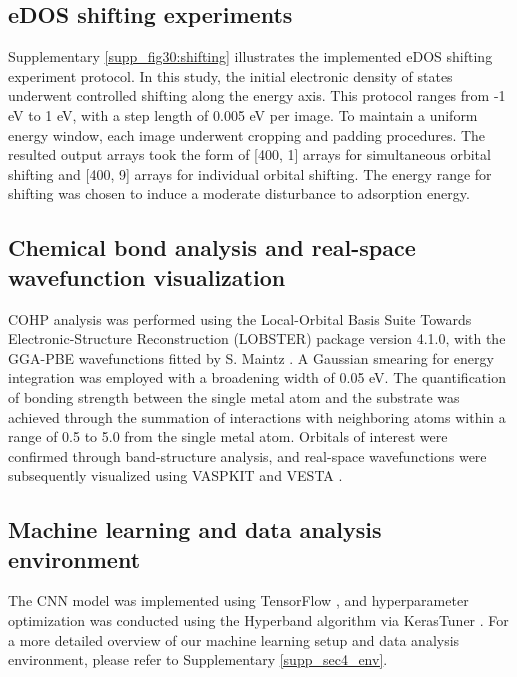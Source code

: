 \documentclass[a4paper, 12pt, titlepage]{article}
\begin{document}
    \subsection{eDOS shifting experiments}
    Supplementary \cref{supp_fig30:shifting} illustrates the implemented eDOS shifting experiment protocol.
    In this study, the initial electronic density of states underwent controlled shifting along the energy axis.
    This protocol ranges from -1 eV to 1 eV, with a step length of 0.005 eV per image.
    To maintain a uniform energy window, each image underwent cropping and padding procedures.
    The resulted output arrays took the form of [400, 1] arrays for simultaneous orbital shifting and [400, 9] arrays for individual orbital shifting.
    The energy range for shifting was chosen to induce a moderate disturbance to adsorption energy.


    \subsection{Chemical bond analysis and real-space wavefunction visualization}
    COHP analysis was performed using the Local-Orbital Basis Suite Towards Electronic-Structure Reconstruction (LOBSTER) package  \cite{deringer2011crystal, koga1999analytical, nelson2020lobster, maintz2013analytic, dronskowski1993crystal} version 4.1.0, with the GGA-PBE wavefunctions fitted by S. Maintz \cite{koga1999analytical, maintz2016lobster}.
    A Gaussian smearing for energy integration was employed with a broadening width of 0.05 eV.
    The quantification of bonding strength between the single metal atom and the substrate was achieved through the summation of interactions with neighboring atoms within a range of 0.5 \text{\AA} to 5.0 \text{\AA} from the single metal atom.
    Orbitals of interest were confirmed through band-structure analysis, and real-space wavefunctions were subsequently visualized using VASPKIT \cite{wang2021vaspkit} and VESTA \cite{momma2008vesta}.

    \subsection{Machine learning and data analysis environment}
    The CNN model was implemented using TensorFlow \cite{abadi2016tensorflow}, and hyperparameter optimization was conducted using the Hyperband \cite{li2018hyperband} algorithm via KerasTuner \cite{omalley2019kerastuner}.
    For a more detailed overview of our machine learning setup and data analysis environment, please refer to Supplementary \cref{supp_sec4_env}.
\end{document}
